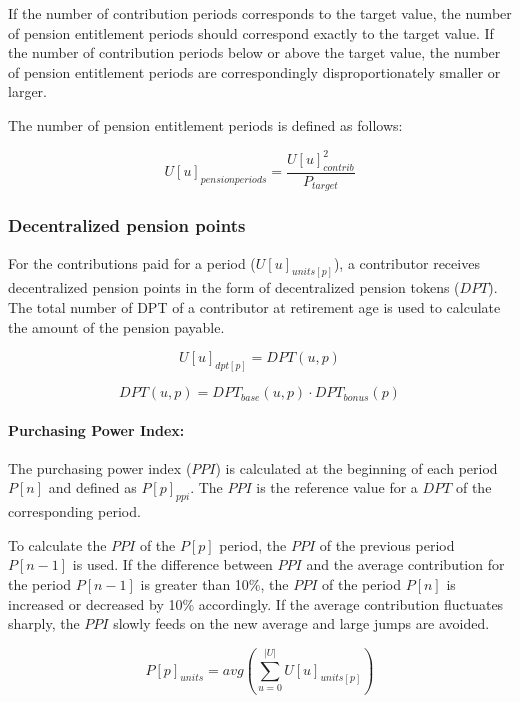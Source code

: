 If the number of contribution periods corresponds to the target value, the number of pension entitlement periods should correspond exactly to the target value. If the number of contribution periods below or above the target value, the number of pension entitlement periods are correspondingly disproportionately smaller or larger.  

The number of pension entitlement periods is defined as follows:

\begin{equation}
U[u]_{pensionperiods} = \frac{U[u]_{contrib}^2}{P_{target}}
\end{equation}


\subsubsection{Decentralized pension points}
For the contributions paid for a period ($U[u]_{units[p]}$), a contributor receives decentralized pension points in the form of decentralized pension tokens ($DPT$). The total number of DPT of a contributor at retirement age is used to calculate the amount of the pension payable.

\begin{equation}
U[u]_{dpt[p]} = DPT(u, p)
\end{equation}

\begin{equation}
DPT(u, p) = DPT_{base}(u, p) \cdot DPT_{bonus}(p)
\end{equation}

\paragraph*{Purchasing Power Index:}
The purchasing power index ($PPI$) is calculated at the beginning of each period $P[n]$ and defined as $P[p]_{ppi}$. The $PPI$ is the reference value for a $DPT$ of the corresponding period.

To calculate the $PPI$ of the $P[p]$ period, the $PPI$ of the previous period $P[n-1]$ is used.
If the difference between $PPI$ and the average contribution for the period $P[n-1]$ is greater than 10\%, the $PPI$ of the period $P[n]$ is increased or decreased by 10\% accordingly.
If the average contribution fluctuates sharply, the $PPI$ slowly feeds on the new average and large jumps are avoided.

\begin{equation}
P[p]_{units} = avg(\sum_{u=0}^{|U|} U[u]_{units[p]})
\end{equation}


